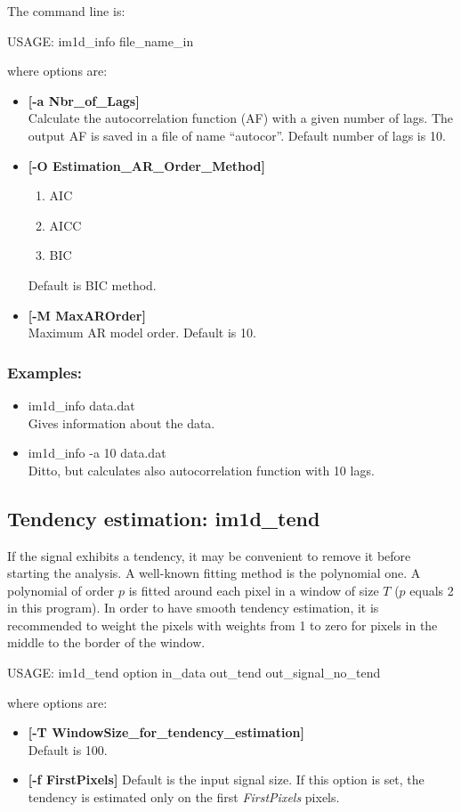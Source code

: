 The command line is:
{\bf
\begin{center}
     USAGE: im1d\_info file\_name\_in 
\end{center}
}
where options are:
\begin{itemize}
\baselineskip=0.4truecm
\itemsep=0.1truecm
\item {\bf[-a Nbr\_of\_Lags]} \\
 Calculate the autocorrelation function (AF) with a given number of lags.
The output AF is saved in a file of name ``autocor''.
Default number of lags is 10.
\item {\bf[-O Estimation\_AR\_Order\_Method]} 
\begin{enumerate}
\baselineskip=0.4truecm
\itemsep=0.1truecm
\item AIC 
\item AICC
\item BIC
\end{enumerate}
Default is BIC method.
\item {\bf[-M MaxAROrder]} \\
Maximum AR model order. Default is 10.
\end{itemize}
\subsubsection*{Examples:}
\begin{itemize}
\itemsep=0.1truecm
\item im1d\_info data.dat  \\
Gives information about the data.
\item im1d\_info -a 10 data.dat \\
Ditto, but calculates also autocorrelation function with 10 lags.
\end{itemize}

\subsection{Tendency estimation: im1d\_tend}
If the signal exhibits a tendency, it may be convenient to remove it
before starting the analysis. A well-known fitting
method is the polynomial one.
A polynomial of order $p$ is fitted around each pixel 
in a window of size $T$ ($p$ equals 2 in this program). 
In order to have smooth tendency estimation,
it is recommended to weight the pixels with weights from 1 to zero for pixels
in the middle to the border of the window.
{\bf
\begin{center}
 USAGE: im1d\_tend option in\_data out\_tend out\_signal\_no\_tend
\end{center}}
where options are:
\begin{itemize}
\baselineskip=0.4truecm
\itemsep=0.1truecm
\item {\bf [-T WindowSize\_for\_tendency\_estimation]} \\
Default is 100.
\item {\bf [-f FirstPixels]} 
Default is the input signal size. If this option is set, the tendency is
estimated only on the first {\em FirstPixels} pixels.
\end{itemize}
